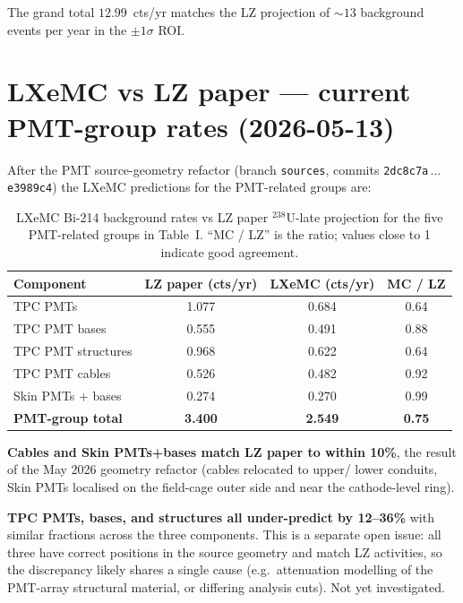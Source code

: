 \documentclass[11pt]{article}
\begin{document}
The grand total $12.99$~cts/yr matches the LZ projection of
$\sim 13$ background events per year in the $\pm 1\sigma$ ROI.

\section*{LXeMC vs LZ paper --- current PMT-group rates (2026-05-13)}

After the PMT source-geometry refactor (branch \texttt{sources}, commits
\texttt{2dc8c7a}\,$\ldots$\,\texttt{e3989c4}) the LXeMC predictions for
the PMT-related groups are:

\begin{table}[h]
\centering
\caption{LXeMC Bi-214 background rates vs LZ paper $^{238}$U-late
projection for the five PMT-related groups in Table~I. ``MC / LZ''
is the ratio; values close to 1 indicate good agreement.}
\label{tab:mc-vs-lz-pmt}
\begin{tabular}{@{}lS[table-format=1.3]S[table-format=1.3]S[table-format=1.2]@{}}
\toprule
{Component} & {LZ paper (cts/yr)} & {LXeMC (cts/yr)} & {MC / LZ} \\
\midrule
TPC PMTs              & 1.077 & 0.684 & 0.64 \\
TPC PMT bases         & 0.555 & 0.491 & 0.88 \\
TPC PMT structures    & 0.968 & 0.622 & 0.64 \\
TPC PMT cables        & 0.526 & 0.482 & 0.92 \\
Skin PMTs + bases     & 0.274 & 0.270 & 0.99 \\
\midrule
\textbf{PMT-group total} & \textbf{3.400} & \textbf{2.549} & \textbf{0.75} \\
\bottomrule
\end{tabular}
\end{table}

\textbf{Cables and Skin PMTs+bases match LZ paper to within 10\%}, the
result of the May 2026 geometry refactor (cables relocated to upper/
lower conduits, Skin PMTs localised on the field-cage outer side and
near the cathode-level ring).

\textbf{TPC PMTs, bases, and structures all under-predict by 12--36\%}
with similar fractions across the three components. This is a separate
open issue: all three have correct positions in the source geometry
and match LZ activities, so the discrepancy likely shares a single
cause (e.g.\ attenuation modelling of the PMT-array structural
material, or differing analysis cuts). Not yet investigated.
\end{document}
